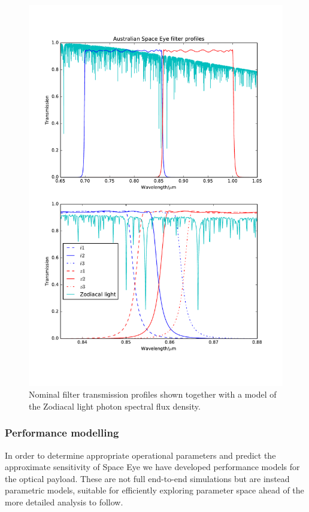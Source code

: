 \documentclass[]{iac}
\begin{document}
\begin{figure}[htp]
  \center \includegraphics[width=\columnwidth]{figures/filters.pdf}
  \caption{\label{fig:filters}Nominal filter transmission profiles shown together with a model of the Zodiacal light
    photon spectral flux density.}
\end{figure}

\subsubsection{Performance modelling} \label{sec:perf}

In order to determine appropriate operational parameters and predict the approximate sensitivity of Space Eye we have
developed performance models for the optical payload. These are not full end-to-end simulations but are instead
parametric models, suitable for efficiently exploring parameter space ahead of the more detailed analysis to follow.
\end{document}
